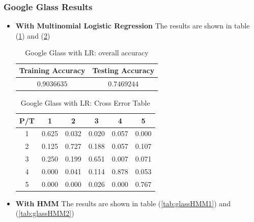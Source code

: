 \subsubsection{Google Glass Results}
\label{sec:glassresult}
\begin{itemize}
\item \textbf{With Multinomial Logistic Regression} 
The results are shown in table (\ref{tab:glassLR1}) and (\ref{tab:glassLR2})

\begin{table}[!htb]
\begin{center}
\begin{tabular}{c|c}
      \hline
      Training Accuracy & Testing Accuracy\\
      \hline
      $0.9036635$ & $0.7469244$ \\
      \hline
\end{tabular}
\caption{Google Glass with LR: overall accuracy}
\label{tab:glassLR1}
\end{center}
\end{table}

\begin{table}[!htb]
\begin{center}
\begin{tabular}{c|c|c|c|c|c}
      \hline
      P/T& 1 & 2 &3 & 4 & 5 \\
      \hline
      1 &0.625&0.032&0.020&0.057&0.000\\
      2 &0.125&0.727&0.188&0.057&0.107\\
      3 &0.250&0.199&0.651&0.007&0.071\\
      4 &0.000&0.041&0.114&0.878&0.053\\
      5 & 0.000&0.000&0.026&0.000&0.767\\
      \hline
\end{tabular}
\caption{Google Glass with LR: Cross Error Table}
\label{tab:glassLR2}
\end{center}
\end{table}
\item \textbf{With HMM}
The results are shown in table (\ref{tab:glassHMM1}) and (\ref{tab:glassHMM2})


\end{itemize}
